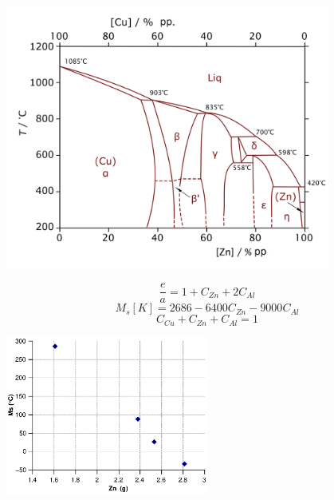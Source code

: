 \documentclass[usenames,dvipsnames]{beamer}
\begin{document}
\begin{frame}
\includegraphics[width=0.8\textwidth]{img/intro/CuZn.png}
\end{frame}


\begin{frame}
\begin{multicols}{2}
 
 \begin{equation*}
\frac{e}{a} = 1+C_{Zn}+2C_{Al}
\end{equation*}
\begin{equation*}
M_s[K]=2686-6400C_{Zn}-9000C_{Al} \label{Ms} 
\end{equation*}
\begin{equation*}
     C_{Cu}+C_{Zn}+C_{Al}=1
\end{equation*}

\includegraphics[width=0.5\textwidth]{img/intro/MsZn2.eps}

\end{multicols}

\end{frame}

\end{document}
